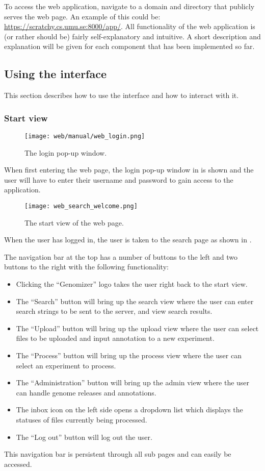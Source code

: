 To access the web application, navigate to a domain and directory that publicly serves the web page. An example of this could be: \url{https://scratchy.cs.umu.se:8000/app/}. All functionality of the web application is (or rather should be) fairly self-explanatory and intuitive. A short description and explanation will be given for each component that has been implemented so far.
\subsection{Using the interface}
This section describes how to use the interface and how to interact with it.
\subsubsection{Start view}
\begin{figure}[h]
\centering
\texttt{[image: web/manual/web\_login.png]}
\caption{\label{fig:web_search_login} The login pop-up window.}
\end{figure}
When first entering the web page, the login pop-up window in  is shown and the user will have to enter their username and password to gain access to the application.

\begin{figure}[h] 
\centering
\texttt{[image: web\_search\_welcome.png]}
\caption{\label{fig:web_search_welcome} The start view of the web page.}
\end{figure}

When the user has logged in, the user is taken to the search page as shown in .

The navigation bar at the top has a number of buttons to the left and two buttons to the right with the following functionality:
\begin{itemize}
	\item Clicking the “Genomizer” logo takes the user right back to the start view.
	\item The “Search” button will bring up the search view where the user can enter search strings to be sent to the server, and view search results.
	\item The “Upload” button will bring up the upload view where the user can select files to be uploaded and input annotation to a new experiment.
	\item The “Process” button will bring up the process view where the user can select an experiment to process.
	\item The “Administration” button will bring up the admin view where the user can handle genome releases and annotations.
    \item The inbox icon on the left side opens a dropdown list which displays the statuses of files currently being processed.
    \item The “Log out” button will log out the user.
\end{itemize}
This navigation bar is persistent through all sub pages and can easily be accessed.

